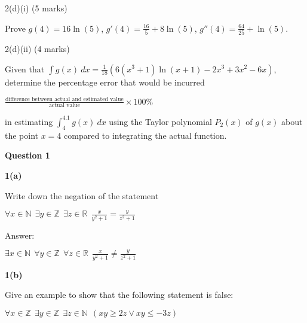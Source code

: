\documentclass[a4paper,12pt,oneside]{book}
\theoremstyle{definition}
\begin{document}
2(d)(i) (5 marks) 

Prove $g(4) = 16 \ln(5)$, $g'(4) = \frac{16}{5} + 8 \ln(5)$, $g''(4) = \frac{64}{25} + \ln(5)$.

2(d)(ii) (4 marks)

Given that  $\int g(x) \ dx = \frac{1}{18} (6 (x^3 + 1) \ln(x + 1) - 2x^3 + 3x^2 - 6x)$, determine the percentage error that would be incurred

$\frac{\text{difference between actual and estimated value}}{\text{actual value}} \times 100 \%$

in estimating $\int_4^{4.1} g(x) \ dx$ using the Taylor polynomial  $P_2(x)$ of $g(x)$ about the point $x=4$ compared to integrating the actual function.








	
\newpage


































\bigskip

\noindent
{\bf Question 1}

\bigskip

\noindent
{\bf 1(a)}

Write down the negation of the statement

$\forall x \in \mathbb{N} \  \ \exists y \in \mathbb{Z} \ \ \exists z \in \mathbb{R} \ \ \frac{x}{y^2+1} = \frac{y}{z^2+1}$

Answer:

$\exists x \in \mathbb{N} \  \ \forall y \in \mathbb{Z} \ \ \forall z \in \mathbb{R} \ \ \frac{x}{y^2+1} \neq \frac{y}{z^2+1}$

\bigskip

\noindent
{\bf 1(b)}

Give an example to show that the following statement is false:

$\forall x \in \mathbb{Z} \ \ \exists y \in \mathbb{Z} \ \ \exists z \in \mathbb{N} \ \ (xy \geq 2z \vee xy \leq -3z)$
\end{document}
